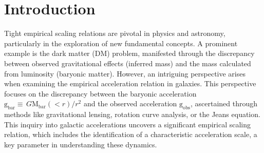\documentclass[a4paper, two-column, twocolappendix]{aa}
\newcommand{\Mbar}{\mathrm{M}_\mathrm{bar}}
\newcommand{\gbar}{\mathrm{g}_\mathrm{bar}}
\newcommand{\gobs}{\mathrm{g}_\mathrm{obs}}
\begin{document}

\maketitle

%
%

\section{Introduction}

Tight empirical scaling relations are pivotal in physics and astronomy, particularly in the exploration of new fundamental concepts. 
A prominent example is the dark matter (DM) problem, manifested through the discrepancy between observed gravitational effects (inferred mass) and the mass calculated from luminosity (baryonic matter). 
However, an intriguing perspective arises when examining the empirical acceleration relation in galaxies. This perspective focuses on the discrepancy between the baryonic acceleration $\gbar\equiv\,G\Mbar(<r)/r^{2}$ and the observed acceleration $\gobs$, ascertained through methods like gravitational lensing, rotation curve analysis, or the Jeans equation. 
This inquiry into galactic accelerations uncovers a significant empirical scaling relation, which includes the identification of a characteristic acceleration scale, a key parameter in understanding these dynamics.
\end{document}
